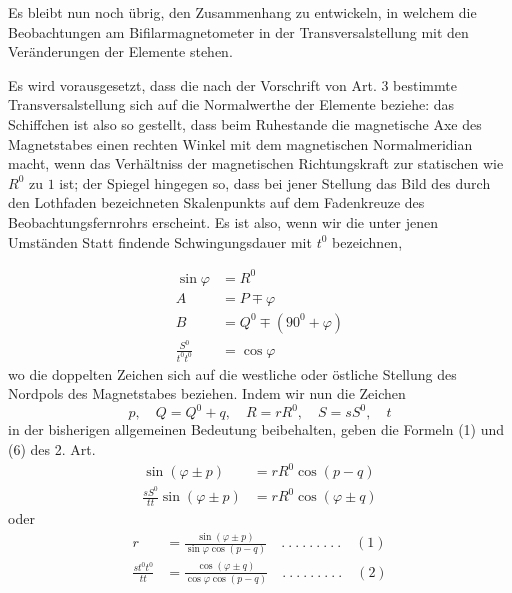Es bleibt nun noch übrig, den Zusammenhang zu entwickeln, in welchem die Beobachtungen am Bifilarmagnetometer in der Transversalstellung mit den Veränderungen der Elemente stehen.

Es wird vorausgesetzt, dass die nach der Vorschrift von Art. 3 bestimmte Transversalstellung sich auf die Normalwerthe der Elemente beziehe: das Schiffchen ist also so gestellt, dass beim Ruhestande die magnetische Axe des Magnetstabes einen rechten Winkel mit dem magnetischen Normalmeridian macht, wenn das Verhältniss der magnetischen Richtungskraft zur statischen wie $R^0$ zu $1$ ist; der Spiegel hingegen so, dass bei jener Stellung das Bild des durch den Lothfaden bezeichneten Skalenpunkts auf dem Fadenkreuze des Beobachtungsfernrohrs erscheint. Es ist also, wenn wir die unter jenen Umständen Statt findende Schwingungsdauer mit $t^0$ bezeichnen,
\par\clearpage
{}
\[
\begin{aligned}
\sin\varphi&=R^0\\
A&=P\mp\varphi\\
B&=Q^0\mp(90^0+\varphi)\\
\frac{S^0}{t^0t^0}&=\cos\varphi
\end{aligned}
\]
wo die doppelten Zeichen sich auf die westliche oder östliche Stellung des Nordpols des Magnetstabes beziehen. Indem wir nun die Zeichen
\[
p,\quad Q=Q^0+q,\quad R=rR^0,\quad S=sS^0,\quad t
\]
in der bisherigen allgemeinen Bedeutung beibehalten, geben die Formeln (1) und (6) des 2. Art.
\[
\begin{aligned}
\sin(\varphi\pm p)&=rR^0\cos(p-q)\\
\frac{sS^0}{tt}\sin(\varphi\pm p)&=rR^0\cos(\varphi\pm q)
\end{aligned}
\]
oder
\[
\begin{aligned}
r&=\frac{\sin(\varphi\pm p)}{\sin\varphi\cos(p-q)}\quad .\ .\ .\ .\ .\ .\ .\ .\ .\quad(1)\\
\frac{st^0t^0}{tt}&=\frac{\cos(\varphi\pm q)}{\cos\varphi\cos(p-q)}\quad .\ .\ .\ .\ .\ .\ .\ .\ .\quad(2)
\end{aligned}
\]

